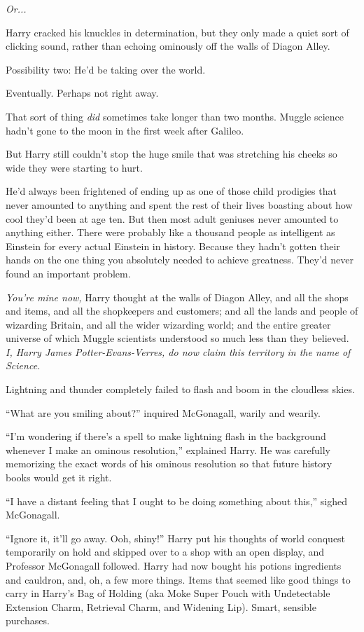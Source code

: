 \emph{Or...}

Harry cracked his knuckles in determination, but they only made a quiet sort of clicking sound, rather than echoing ominously off the walls of Diagon Alley.

Possibility two: He’d be taking over the world.

Eventually. Perhaps not right away.

That sort of thing \emph{did} sometimes take longer than two months. Muggle science hadn’t gone to the moon in the first week after Galileo.

But Harry still couldn’t stop the huge smile that was stretching his cheeks so wide they were starting to hurt.

He’d always been frightened of ending up as one of those child prodigies that never amounted to anything and spent the rest of their lives boasting about how cool they’d been at age ten. But then most adult geniuses never amounted to anything either. There were probably like a thousand people as intelligent as Einstein for every actual Einstein in history. Because they hadn’t gotten their hands on the one thing you absolutely needed to achieve greatness. They’d never found an important problem.

\emph{You’re mine now,} Harry thought at the walls of Diagon Alley, and all the shops and items, and all the shopkeepers and customers; and all the lands and people of wizarding Britain, and all the wider wizarding world; and the entire greater universe of which Muggle scientists understood so much less than they believed. \emph{I, Harry James Potter-Evans-Verres, do now claim this territory in the name of Science.}

Lightning and thunder completely failed to flash and boom in the cloudless skies.

“What are you smiling about?” inquired McGonagall, warily and wearily.

“I’m wondering if there’s a spell to make lightning flash in the background whenever I make an ominous resolution,” explained Harry. He was carefully memorizing the exact words of his ominous resolution so that future history books would get it right.

“I have a distant feeling that I ought to be doing something about this,” sighed McGonagall.

“Ignore it, it’ll go away. Ooh, shiny!” Harry put his thoughts of world conquest temporarily on hold and skipped over to a shop with an open display, and Professor McGonagall followed.
\sbreak
Harry had now bought his potions ingredients and cauldron, and, oh, a few more things. Items that seemed like good things to carry in Harry’s Bag of Holding (aka Moke Super Pouch  with Undetectable Extension Charm, Retrieval Charm, and Widening Lip). Smart, sensible purchases.

